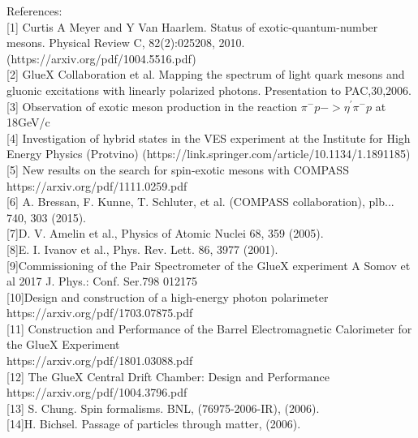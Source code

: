 \documentclass[11pt]{article}
\begin{document}
References:\\

[1] Curtis A Meyer and Y Van Haarlem. Status of exotic-quantum-number mesons. Physical Review C, 82(2):025208, 2010.\\
(https://arxiv.org/pdf/1004.5516.pdf)\\

[2] GlueX Collaboration et al. Mapping the spectrum of light quark mesons and gluonic excitations with linearly polarized photons. Presentation to PAC,30,2006.\\

[3] Observation of exotic meson production in the reaction $\pi^{-}p->\eta^{'}\pi^{-}p$ at 18GeV/c\\

[4] Investigation of hybrid states in the VES experiment at the Institute for High Energy Physics (Protvino)
(https://link.springer.com/article/10.1134/1.1891185)\\

[5] New results on the search for spin-exotic mesons with COMPASS
https://arxiv.org/pdf/1111.0259.pdf\\

[6] A. Bressan, F. Kunne, T. Schluter, et al. (COMPASS collaboration), plb... 740, 303 (2015).\\

[7]D. V. Amelin et al., Physics of Atomic Nuclei 68, 359 (2005).\\

[8]E. I. Ivanov et al., Phys. Rev. Lett. 86, 3977 (2001).\\

[9]Commissioning of the Pair Spectrometer of the GlueX experiment
A Somov et al 2017 J. Phys.: Conf. Ser.798 012175\\

[10]Design and construction of a high-energy photon polarimeter
https://arxiv.org/pdf/1703.07875.pdf\\

[11] Construction and Performance of the Barrel Electromagnetic Calorimeter for the GlueX Experiment\\
https://arxiv.org/pdf/1801.03088.pdf\\

[12] The GlueX Central Drift Chamber: Design and Performance\\
https://arxiv.org/pdf/1004.3796.pdf\\

[13] S. Chung. Spin formalisms. BNL, (76975-2006-IR), (2006).\\

[14]H. Bichsel. Passage of particles through matter, (2006).\\
\end{document}
